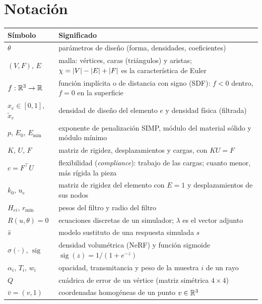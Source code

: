 \documentclass[11pt,a4paper,twoside,openany]{book}
\newcommand{\xf}{\tilde{x}}
\newcommand{\Emin}{E_{\min}}
\newcommand{\rmin}{r_{\min}}
\newcommand{\sigm}{\operatorname{sig}}
\newcommand{\T}{\top}
\begin{document}
\section*{Notación}
\begin{center}\small
\begin{tabularx}{\textwidth}{@{}l>{\raggedright\arraybackslash}X@{}}
\toprule
Símbolo & Significado \\
\midrule
$\theta$ & parámetros de diseño (forma, densidades, coeficientes) \\
$(V,F)$, $E$ & malla: vértices, caras (triángulos) y aristas; $\chi=\lvert V\rvert-\lvert E\rvert+\lvert F\rvert$ es la característica de Euler \\
$f:\mathbb{R}^3\to\mathbb{R}$ & función implícita o de distancia con signo (SDF): $f<0$ dentro, $f=0$ en la superficie \\
$x_e\in[0,1]$, $\xf_e$ & densidad de diseño del elemento $e$ y densidad física (filtrada) \\
$p$, $E_0$, $\Emin$ & exponente de penalización SIMP, módulo del material sólido y módulo mínimo \\
$K$, $U$, $F$ & matriz de rigidez, desplazamientos y cargas, con $KU=F$ \\
$c=F^\T U$ & flexibilidad (\emph{compliance}): trabajo de las cargas; cuanto menor, más rígida la pieza \\
$k_0$, $u_e$ & matriz de rigidez del elemento con $E=1$ y desplazamientos de sus nodos \\
$H_{ei}$, $\rmin$ & pesos del filtro y radio del filtro \\
$R(u,\theta)=0$ & ecuaciones discretas de un simulador; $\lambda$ es el vector adjunto \\
$\hat s$ & modelo sustituto de una respuesta simulada $s$ \\
$\sigma(\cdot)$, $\sigm$ & densidad volumétrica (NeRF) y función sigmoide $\sigm(z)=1/(1+e^{-z})$ \\
$\alpha_i$, $T_i$, $w_i$ & opacidad, transmitancia y peso de la muestra $i$ de un rayo \\
$Q$ & cuádrica de error de un vértice (matriz simétrica $4\times 4$) \\
$\bar v=(v,1)$ & coordenadas homogéneas de un punto $v\in\mathbb{R}^3$ \\
\bottomrule
\end{tabularx}
\end{center}

\tableofcontents

\mainmatter







\appendix


\backmatter

\end{document}
